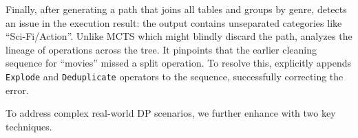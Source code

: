 \begin{example}
    Finally, after generating a path that joins all tables and groups by genre, \sys detects an issue in the execution result: the output contains unseparated categories like ``Sci-Fi/Action''. Unlike MCTS which might blindly discard the path, \sys analyzes the lineage of operations across the tree. It pinpoints that the earlier cleaning sequence for ``{movies}'' missed a split operation. To resolve this, \sys explicitly appends \texttt{Explode} and \texttt{Deduplicate} operators to the sequence, successfully correcting the error.

\end{example}



To address complex real-world DP scenarios, we further enhance \sys with two key techniques.

